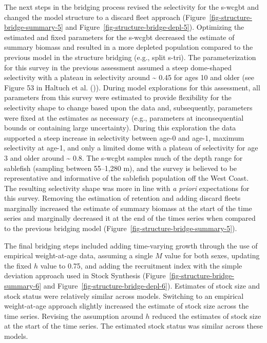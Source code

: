 \documentclass[
  english,
]{article}
\begin{document}
The next steps in the bridging process revised the selectivity for the
\gls{s-wcgbt} and changed the model structure to a discard fleet
approach (Figure~\ref{fig-structure-bridge-summary-5} and
Figure~\ref{fig-structure-bridge-depl-5}). Optimizing the estimated and
fixed parameters for the \gls{s-wcgbt} decreased the estimate of summary
biomass and resulted in a more depleted population compared to the
previous model in the structure bridging (e.g., split \gls{s-tri}). The
parameterization for this survey in the previous assessment assumed a
steep dome-shaped selectivity with a plateau in selectivity around
\textasciitilde{} 0.45 for ages 10 and older (see Figure 53 in Haltuch
et al. ()). During model
explorations for this assessment, all parameters from this survey were
estimated to provide flexibility for the selectivity shape to change
based upon the data and, subsequently, parameters were fixed at the
estimates as necessary (e.g., parameters at inconsequential bounds or
containing large uncertainty). During this exploration the data
supported a steep increase in selectivity between age-0 and age-1,
maximum selectivity at age-1, and only a limited dome with a plateau of
selectivity for age 3 and older around \textasciitilde{} 0.8. The
\gls{s-wcgbt} samples much of the depth range for sablefish (sampling
between 55--1,280 m), and the survey is believed to be representative
and informative of the sablefish population off the West Coast. The
resulting selectivity shape was more in line with \emph{a priori}
expectations for this survey. Removing the estimation of retention and
adding discard fleets marginally increased the estimate of summary
biomass at the start of the time series and marginally decreased it at
the end of the times series when compared to the previous bridging model
(Figure~\ref{fig-structure-bridge-summary-5}).

The final bridging steps included adding time-varying growth through the
use of empirical weight-at-age data, assuming a single \(M\) value for
both sexes, updating the fixed \(h\) value to 0.75, and adding the
recruitment index with the simple deviation approach used in Stock
Synthesis (Figure~\ref{fig-structure-bridge-summary-6} and
Figure~\ref{fig-structure-bridge-depl-6}). Estimates of stock size and
stock status were relatively similar across models. Switching to an
empirical weight-at-age approach slightly increased the estimate of
stock size across the time series. Revising the assumption around \(h\)
reduced the estimates of stock size at the start of the time series. The
estimated stock status was similar across these models.
\end{document}
